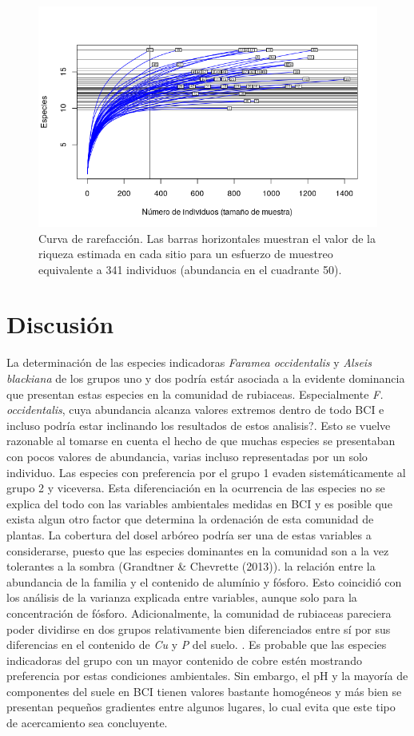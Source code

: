 \documentclass[11pt,]{article}
\begin{document}
\begin{figure}
\centering
\includegraphics{rarefaccion_min_abun.png}
\caption{Curva de rarefacción. Las barras horizontales muestran el valor
de la riqueza estimada en cada sitio para un esfuerzo de muestreo
equivalente a 341 individuos (abundancia en el cuadrante 50).
\label{fig:rarefaccion_min_abun}}
\end{figure}

\section{Discusión}\label{discusiuxf3n}

La determinación de las especies indicadoras \emph{Faramea occidentalis}
y \emph{Alseis blackiana} de los grupos uno y dos podría estár asociada
a la evidente dominancia que presentan estas especies en la comunidad de
rubiaceas. Especialmente \emph{F. occidentalis}, cuya abundancia alcanza
valores extremos dentro de todo BCI e incluso podría estar inclinando
los resultados de estos analisis?. Esto se vuelve razonable al tomarse
en cuenta el hecho de que muchas especies se presentaban con pocos
valores de abundancia, varias incluso representadas por un solo
individuo. Las especies con preferencia por el grupo 1 evaden
sistemáticamente al grupo 2 y viceversa. Esta diferenciación en la
ocurrencia de las especies no se explica del todo con las variables
ambientales medidas en BCI y es posible que exista algun otro factor que
determina la ordenación de esta comunidad de plantas. La cobertura del
dosel arbóreo podría ser una de estas variables a considerarse, puesto
que las especies dominantes en la comunidad son a la vez tolerantes a la
sombra (Grandtner \& Chevrette (2013)). la relación entre la abundancia
de la familia y el contenido de alumínio y fósforo. Esto coincidió con
los análisis de la varianza explicada entre variables, aunque solo para
la concentración de fósforo. Adicionalmente, la comunidad de rubiaceas
pareciera poder dividirse en dos grupos relativamente bien diferenciados
entre sí por sus diferencias en el contenido de \emph{Cu} y \emph{P} del
suelo. . Es probable que las especies indicadoras del grupo con un mayor
contenido de cobre estén mostrando preferencia por estas condiciones
ambientales. Sin embargo, el pH y la mayoría de componentes del suele en
BCI tienen valores bastante homogéneos y más bien se presentan pequeños
gradientes entre algunos lugares, lo cual evita que este tipo de
acercamiento sea concluyente.
\end{document}

